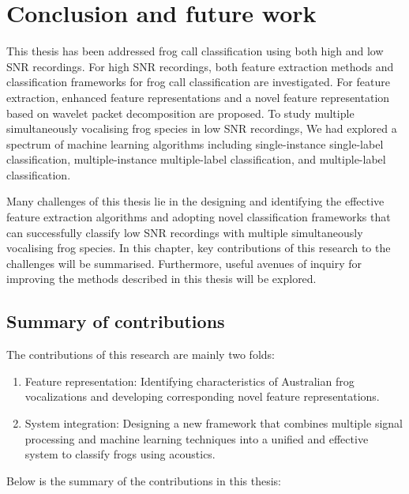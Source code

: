 
\chapter[Conclusion]{Conclusion and future work}
\label{cha:cha8Conclusions}

This thesis has been addressed frog call classification using both high and low SNR recordings. For high SNR recordings, both feature extraction methods and classification frameworks for frog call classification are investigated. For feature extraction, enhanced feature representations and a novel feature representation based on wavelet packet decomposition are proposed.
To study multiple simultaneously vocalising frog species in low SNR recordings, We had explored a spectrum of machine learning algorithms including single-instance single-label classification, multiple-instance multiple-label classification, and multiple-label classification. 

Many challenges of this thesis lie in the designing and identifying the effective feature extraction algorithms and adopting novel classification frameworks that can successfully classify low SNR recordings with multiple simultaneously vocalising frog species. 
In this chapter, key contributions of this research to the challenges will be summarised. Furthermore, useful avenues of inquiry for improving the methods described in this thesis will be explored.

\section{Summary of contributions}
	
The contributions of this research are mainly two folds:

\begin{enumerate}
\item Feature representation: Identifying characteristics of Australian frog vocalizations and developing corresponding novel feature representations.

\item System integration: Designing a new framework that combines multiple signal processing and machine learning techniques into a unified and effective system to classify frogs using acoustics.


\end{enumerate}

Below is the summary of the contributions in this thesis:

